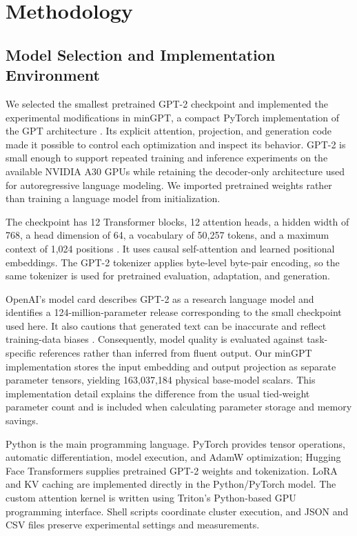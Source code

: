 \section{Methodology}
\label{sec:methodology}

\subsection{Model Selection and Implementation Environment}

We selected the smallest pretrained GPT-2 checkpoint and implemented the experimental modifications in minGPT, a compact PyTorch implementation of the GPT architecture \cite{karpathy_mingpt}. Its explicit attention, projection, and generation code made it possible to control each optimization and inspect its behavior. GPT-2 is small enough to support repeated training and inference experiments on the available NVIDIA A30 GPUs while retaining the decoder-only architecture used for autoregressive language modeling. We imported pretrained weights rather than training a language model from initialization.

The checkpoint has 12 Transformer blocks, 12 attention heads, a hidden width of 768, a head dimension of 64, a vocabulary of 50,257 tokens, and a maximum context of 1,024 positions \cite{gpt2_config}. It uses causal self-attention and learned positional embeddings. The GPT-2 tokenizer applies byte-level byte-pair encoding, so the same tokenizer is used for pretrained evaluation, adaptation, and generation.

OpenAI's model card describes GPT-2 as a research language model and identifies a 124-million-parameter release corresponding to the small checkpoint used here. It also cautions that generated text can be inaccurate and reflect training-data biases \cite{gpt2_modelcard}. Consequently, model quality is evaluated against task-specific references rather than inferred from fluent output. Our minGPT implementation stores the input embedding and output projection as separate parameter tensors, yielding 163,037,184 physical base-model scalars. This implementation detail explains the difference from the usual tied-weight parameter count and is included when calculating parameter storage and memory savings.

Python is the main programming language. PyTorch provides tensor operations, automatic differentiation, model execution, and AdamW optimization; Hugging Face Transformers supplies pretrained GPT-2 weights and tokenization. LoRA and KV caching are implemented directly in the Python/PyTorch model. The custom attention kernel is written using Triton's Python-based GPU programming interface. Shell scripts coordinate cluster execution, and JSON and CSV files preserve experimental settings and measurements.


